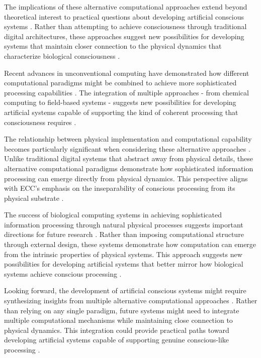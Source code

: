 \begin{refsection}
The implications of these alternative computational approaches extend beyond theoretical interest to practical questions about developing artificial conscious systems \cite{Calude2018a}. Rather than attempting to achieve consciousness through traditional digital architectures, these approaches suggest new possibilities for developing systems that maintain closer connection to the physical dynamics that characterize biological consciousness \cite{Deacon2019}.

Recent advances in unconventional computing have demonstrated how different computational paradigms might be combined to achieve more sophisticated processing capabilities \cite{Gorecki2020}. The integration of multiple approaches - from chemical computing to field-based systems - suggests new possibilities for developing artificial systems capable of supporting the kind of coherent processing that consciousness requires \cite{Jaeger2021}.

The relationship between physical implementation and computational capability becomes particularly significant when considering these alternative approaches \cite{Katz2019}. Unlike traditional digital systems that abstract away from physical details, these alternative computational paradigms demonstrate how sophisticated information processing can emerge directly from physical dynamics. This perspective aligns with ECC's emphasis on the inseparability of conscious processing from its physical substrate \cite{Levin2018}.

The success of biological computing systems in achieving sophisticated information processing through natural physical processes suggests important directions for future research \cite{Mayne2019}. Rather than imposing computational structure through external design, these systems demonstrate how computation can emerge from the intrinsic properties of physical systems. This approach suggests new possibilities for developing artificial systems that better mirror how biological systems achieve conscious processing \cite{Nakagaki2020}.

Looking forward, the development of artificial conscious systems might require synthesizing insights from multiple alternative computational approaches \cite{Stepney2018}. Rather than relying on any single paradigm, future systems might need to integrate multiple computational mechanisms while maintaining close connection to physical dynamics. This integration could provide practical paths toward developing artificial systems capable of supporting genuine conscious-like processing \cite{Toffoli2019}.


\end{refsection}
